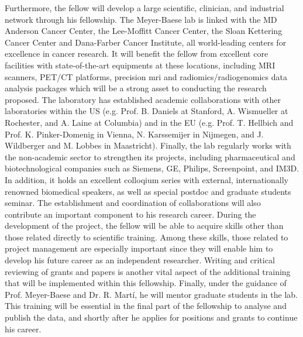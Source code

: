 Furthermore, the fellow will develop a large scientific, clinician, and industrial network through his fellowship.
The Meyer-Baese lab is linked with the MD Anderson Cancer Center, the Lee-Moffitt Cancer Center, the Sloan Kettering Cancer Center and Dana-Farber Cancer Institute, all world-leading centers for excellence in cancer research.
It will benefit the fellow from excellent core facilities with state-of-the-art equipments at these locations, including MRI scanners, PET/CT platforms, precision \ac{mri} and radiomics/radiogenomics data analysis packages which will be a strong asset to conducting the research proposed.
The laboratory has established academic collaborations with other laboratories within the US (e.g. Prof. B. Daniels at Stanford, A. Wismueller at Rochester, and A. Laine at Columbia) and in the EU (e.g. Prof. T. Hellbich and Prof. K. Pinker-Domenig in Vienna, N. Karssemijer in Nijmegen, and J. Wildberger and M. Lobbes in Maastricht).
Finally, the lab regularly works with the non-academic sector to strengthen its projects, including pharmaceutical and biotechnological companies such as Siemens, GE, Philips, Screenpoint, and IM3D.
In addition, it holds an excellent colloqium series with external, internationally renowned biomedical speakers, as well as special postdoc and graduate students seminar.
The establishment and coordination of collaborations will also contribute an important component to his research career.
During the development of the project, the fellow will be able to acquire skills other than those related directly to scientific training.
Among these skills, those related to project management are especially important since they will enable him to develop his future career as an independent researcher.
Writing and critical reviewing of grants and papers is another vital aspect of the additional training that will be implemented within this fellowship.
Finally, under the guidance of Prof. Meyer-Baese and Dr. R. Mart\'i, he will mentor graduate students in the lab.
This training will be essential in the final part of the fellowship to analyse and publish the data, and shortly after he applies for positions and grants to continue his career.

